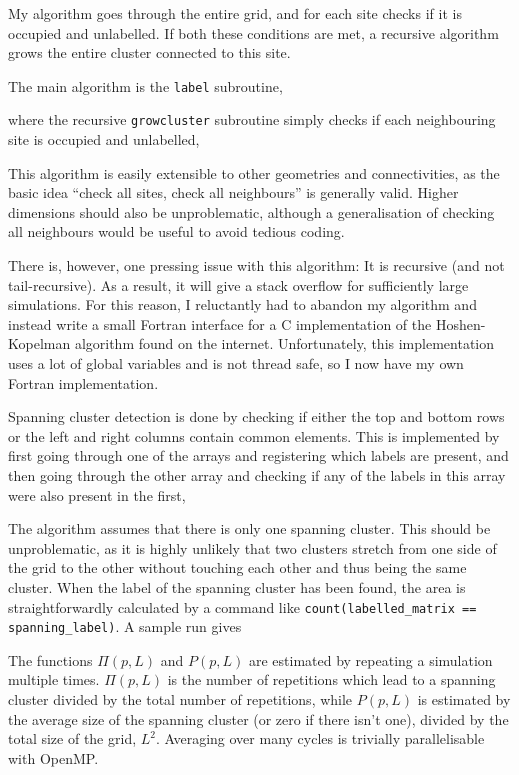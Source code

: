 \documentclass[11pt,british,a4paper]{report}
\begin{document}
My algorithm goes through the entire grid, and for each site checks if it is occupied and unlabelled. If both these conditions are met, a recursive algorithm grows the entire cluster connected to this site.

The main algorithm is the \lstinline{label} subroutine,

where the recursive \lstinline{growcluster} subroutine simply checks if each neighbouring site is occupied and unlabelled,

This algorithm is easily extensible to other geometries and connectivities, as the basic idea ``check all sites, check all neighbours'' is generally valid. Higher dimensions should also be unproblematic, although a generalisation of checking all neighbours would be useful to avoid tedious coding.

There is, however, one pressing issue with this algorithm: It is recursive (and not tail-recursive). As a result, it will give a stack overflow for sufficiently large simulations. For this reason, I reluctantly had to abandon my algorithm and instead write a small Fortran interface for a C implementation of the Hoshen-Kopelman algorithm found on the internet\cite{fricke_hoshen-kopelman_2004}. Unfortunately, this implementation uses a lot of global variables and is not thread safe, so I now have my own Fortran implementation.

Spanning cluster detection is done by checking if either the top and bottom rows or the left and right columns contain common elements. This is implemented by first going through one of the arrays and registering which labels are present, and then going through the other array and checking if any of the labels in this array were also present in the first,

The algorithm assumes that there is only one spanning cluster. This should be unproblematic, as it is highly unlikely that two clusters stretch from one side of the grid to the other without touching each other and thus being the same cluster. When the label of the spanning cluster has been found, the area is straightforwardly calculated by a command like \lstinline{count(labelled_matrix == spanning_label)}.
A sample run gives


The functions \(\Pi(p,L)\) and \(P(p,L)\) are estimated by repeating a simulation multiple times. \(\Pi(p,L)\) is the number of repetitions which lead to a spanning cluster divided by the total number of repetitions, while \(P(p,L)\) is estimated by the average size of the spanning cluster (or zero if there isn't one), divided by the total size of the grid, \(L^2\). Averaging over many cycles is trivially parallelisable with OpenMP.
\end{document}
